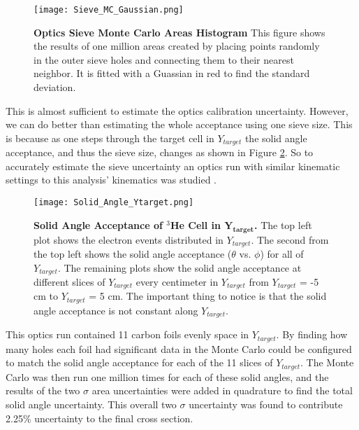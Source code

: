 \begin{figure}[!ht]
\begin{center}
\texttt{[image: Sieve\_MC\_Gaussian.png]}
\end{center}
\caption[Optics Sieve Monte Carlo Areas Histogram]{
{\bf{Optics Sieve Monte Carlo Areas Histogram}} This figure shows the results of one million areas created by placing points randomly in the outer sieve holes and connecting them to their nearest neighbor. It is fitted with a Guassian in red to find the standard deviation.}
\label{fig:sieve_mc_gaussian}
\end{figure}

This is almost sufficient to estimate the optics calibration uncertainty. However, we can do better than estimating the whole acceptance using one sieve size. This is because as one steps through the target cell in $Y_{target}$ the solid angle acceptance, and thus the sieve size, changes as shown in Figure \ref{fig:solid_angle_ytarget}. So to accurately estimate the sieve uncertainty an optics run with similar kinematic settings to this analysis' kinematics was studied \cite{shujie_optics}. 

\begin{figure}[!ht]
\begin{center}
\texttt{[image: Solid\_Angle\_Ytarget.png]}
\end{center}
\caption[Solid Angle Acceptance of $^3$He Cell in $Y_{target}$]{
{\bf{Solid Angle Acceptance of $^3$He Cell in $\boldsymbol{Y_{target}}$.}} The top left plot shows the electron events distributed in $Y_{target}$. The second from the top left shows the solid angle acceptance ($\theta$ vs. $\phi$) for all of $Y_{target}$. The remaining plots show the solid angle acceptance at different slices of $Y_{target}$ every centimeter in $Y_{target}$ from $Y_{target}$ = -5 cm to $Y_{target}$ = 5 cm. The important thing to notice is that the solid angle acceptance is not constant along $Y_{target}$.}
\label{fig:solid_angle_ytarget}
\end{figure}

This optics run contained 11 carbon foils evenly space in $Y_{target}$. By finding how many holes each foil had significant data in the Monte Carlo could be configured to match the solid angle acceptance for each of the 11 slices of $Y_{target}$. The Monte Carlo was then run one million times for each of these solid angles, and the results of the two $\sigma$ area uncertainties were added in quadrature to find the total solid angle uncertainty. This overall two $\sigma$ uncertainty was found to contribute 2.25$\%$ uncertainty to the final cross section.%

